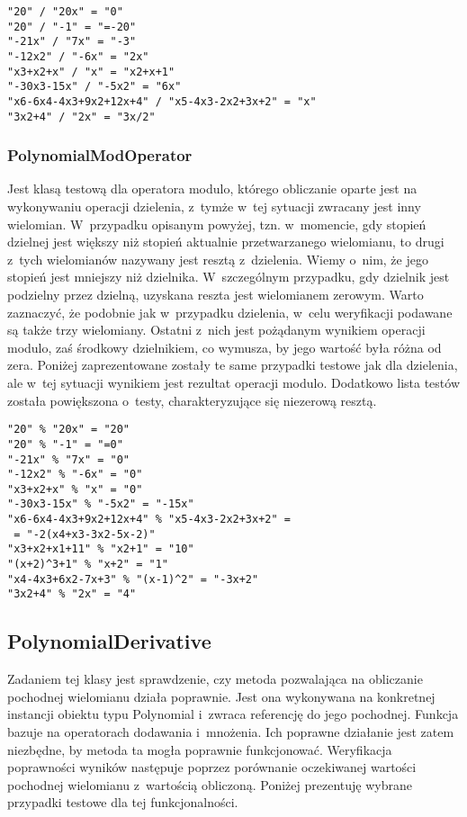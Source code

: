 \begin{lstlisting}
"20" / "20x" = "0"
"20" / "-1" = "=-20"
"-21x" / "7x" = "-3"
"-12x2" / "-6x" = "2x"
"x3+x2+x" / "x" = "x2+x+1"
"-30x3-15x" / "-5x2" = "6x"
"x6-6x4-4x3+9x2+12x+4" / "x5-4x3-2x2+3x+2" = "x"
"3x2+4" / "2x" = "3x/2"
\end{lstlisting}

\subsubsection{PolynomialModOperator}

Jest klasą testową dla operatora modulo, którego obliczanie oparte jest na wykonywaniu operacji dzielenia, z~tymże w~tej sytuacji zwracany jest inny wielomian. W~przypadku opisanym powyżej, tzn. w~momencie, gdy stopień dzielnej jest większy niż stopień aktualnie przetwarzanego wielomianu, to drugi z~tych wielomianów nazywany jest resztą z~dzielenia. Wiemy o~nim, że jego stopień jest mniejszy niż dzielnika. W~szczególnym przypadku, gdy dzielnik jest podzielny przez dzielną, uzyskana reszta jest wielomianem zerowym. Warto zaznaczyć, że podobnie jak w~przypadku dzielenia, w~celu weryfikacji podawane są także trzy wielomiany. Ostatni z~nich jest pożądanym wynikiem operacji modulo, zaś środkowy dzielnikiem, co wymusza, by jego wartość była różna od zera. Poniżej zaprezentowane zostały te same przypadki testowe jak dla dzielenia, ale w~tej sytuacji wynikiem jest rezultat operacji modulo. Dodatkowo lista testów została powiększona o~testy, charakteryzujące się niezerową resztą.

\begin{lstlisting}
"20" % "20x" = "20"
"20" % "-1" = "=0"
"-21x" % "7x" = "0"
"-12x2" % "-6x" = "0"
"x3+x2+x" % "x" = "0"
"-30x3-15x" % "-5x2" = "-15x"
"x6-6x4-4x3+9x2+12x+4" % "x5-4x3-2x2+3x+2" =
 = "-2(x4+x3-3x2-5x-2)"
"x3+x2+x1+11" % "x2+1" = "10"
"(x+2)^3+1" % "x+2" = "1"
"x4-4x3+6x2-7x+3" % "(x-1)^2" = "-3x+2"
"3x2+4" % "2x" = "4"
\end{lstlisting}

\subsection{PolynomialDerivative}

Zadaniem tej klasy jest sprawdzenie, czy metoda pozwalająca na obliczanie pochodnej wielomianu działa poprawnie. Jest ona wykonywana na konkretnej instancji obiektu typu Polynomial i~zwraca referencję do jego pochodnej. Funkcja bazuje na operatorach dodawania i~mnożenia. Ich poprawne działanie jest zatem niezbędne, by metoda ta mogła poprawnie funkcjonować.
Weryfikacja poprawności wyników następuje poprzez porównanie oczekiwanej wartości pochodnej wielomianu z~wartością obliczoną. Poniżej prezentuję wybrane przypadki testowe dla tej funkcjonalności.

